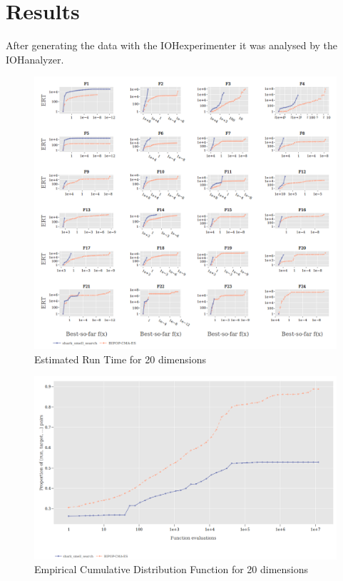 \documentclass[runningheads]{llncs}
\begin{document}
\section{Results}
After generating the data with the IOHexperimenter it was analysed by the IOHanalyzer.

\begin{figure}[h!]
    \centering
    \includegraphics[scale =0.6]{D20-ERT.png}
    \caption{Estimated Run Time for 20 dimensions}
    \label{fig:ERT}
\end{figure}

\begin{figure}[h]
    \centering
    \includegraphics[scale = 0.4]{D20-ECDF.png}
    \caption{Empirical Cumulative Distribution Function for 20 dimensions}
    \label{fig:ECDF}
\end{figure}
\end{document}
